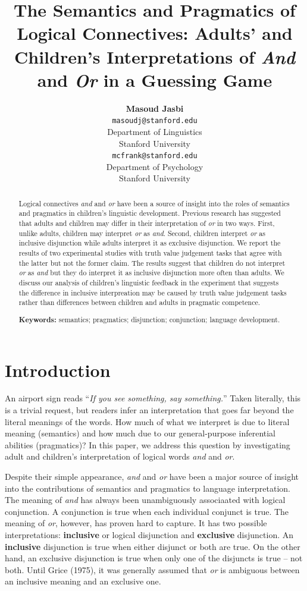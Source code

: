 \documentclass[10pt, letterpaper]{article}
\title{The Semantics and Pragmatics of Logical Connectives: Adults' and
Children's Interpretations of \emph{And} and \emph{Or} in a Guessing
Game}
\author{{\large \bf Masoud Jasbi} \\ \texttt{masoudj@stanford.edu} \\ Department of Linguistics \\ Stanford University \And {\large \bf Michael C. Frank} \\ \texttt{mcfrank@stanford.edu} \\ Department of Psychology \\ Stanford University}
\begin{document}
\maketitle

\begin{abstract}
Logical connectives \emph{and} and \emph{or} have been a source of
insight into the roles of semantics and pragmatics in children's
linguistic development. Previous research has suggested that adults and
children may differ in their interpretation of \emph{or} in two ways.
First, unlike adults, children may interpret \emph{or} as \emph{and}.
Second, children interpret \emph{or} as inclusive disjunction while
adults interpret it as exclusive disjunction. We report the results of
two experimental studies with truth value judgement tasks that agree
with the latter but not the former claim. The results suggest that
children do not interpret \emph{or} as \emph{and} but they do interpret
it as inclusive disjunction more often than adults. We discuss our
analysis of children's linguistic feedback in the experiment that
suggests the difference in inclusive interpreation may be caused by
truth value judgement tasks rather than differences between children and
adults in pragmatic competence.

\textbf{Keywords:}
semantics; pragmatics; disjunction; conjunction; language development.
\end{abstract}

\section{Introduction}\label{introduction}

An airport sign reads ``\emph{If you see something, say something.}''
Taken literally, this is a trivial request, but readers infer an
interpretation that goes far beyond the literal meanings of the words.
How much of what we interpret is due to literal meaning (semantics) and
how much due to our general-purpose inferential abilities (pragmatics)?
In this paper, we address this question by investigating adult and
children's interpretation of logical words \emph{and} and \emph{or}.

Despite their simple appearance, \emph{and} and \emph{or} have been a
major source of insight into the contributions of semantics and
pragmatics to language interpretation. The meaning of \emph{and} has
always been unambiguously associaated with logical conjunction. A
conjunction is true when each individual conjunct is true. The meaning
of \emph{or}, however, has proven hard to capture. It has two possible
interpretations: \textbf{inclusive} or logical disjunction and
\textbf{exclusive} disjunction. An \textbf{inclusive} disjunction is
true when either disjunct or both are true. On the other hand, an
exclusive disjunction is true when only one of the disjuncts is true --
not both. Until Grice (1975), it was generally assumed that \emph{or} is
ambiguous between an inclusive meaning and an exclusive one.
\end{document}

